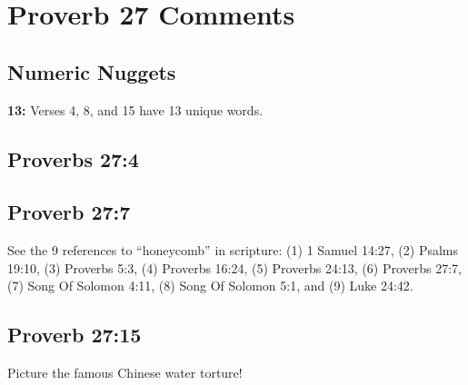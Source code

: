 \section{Proverb 27 Comments}

\subsection{Numeric Nuggets}
\textbf{13:} Verses 4, 8, and 15 have 13 unique words.

\subsection{Proverbs 27:4}



\subsection{Proverb 27:7}
See the 9 references to ``honeycomb'' in scripture: (1) 1 Samuel 14:27, (2) Psalms 19:10, (3) Proverbs 5:3, (4) Proverbs 16:24, (5) Proverbs 24:13, (6) Proverbs 27:7, (7) Song Of Solomon 4:11, (8) Song Of Solomon 5:1, and (9) Luke 24:42.


\subsection{Proverb 27:15}
Picture the famous Chinese water torture!
